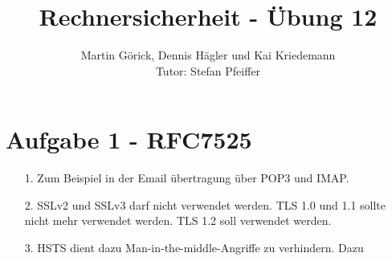 \documentclass{scrartcl}
\title{Rechnersicherheit - Übung 12}
\author{Martin Görick, Dennis Hägler und Kai Kriedemann \\ Tutor: Stefan Pfeiffer}
\begin{document}
\maketitle


\section*{Aufgabe 1 - RFC7525}
\begin{itemize}
  \item[1.] Zum Beispiel in der Email übertragung über POP3 und IMAP.
  \item[2.] SSLv2 und SSLv3 darf nicht verwendet werden. TLS 1.0 und 1.1 sollte nicht mehr verwendet werden. TLS 1.2 soll verwendet werden.
  \item[3.] HSTS dient dazu Man-in-the-middle-Angriffe zu verhindern. Dazu
\end{itemize}
\end{document}
